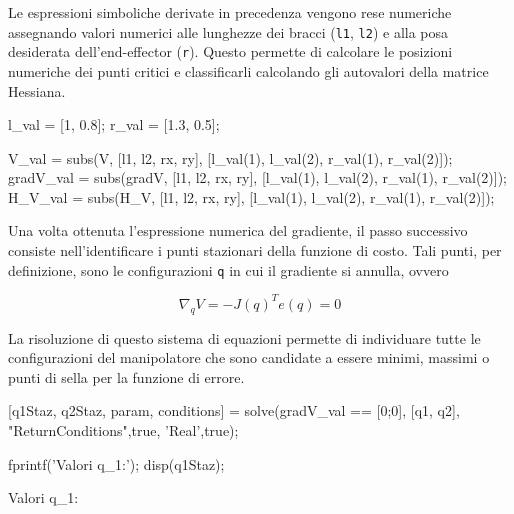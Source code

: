 \documentclass[11pt, a4paper]{article}
\begin{document}
\newpage
{}

\begin{par}
\begin{flushleft}
Le espressioni simboliche derivate in precedenza vengono rese numeriche assegnando valori numerici alle lunghezze dei bracci (\texttt{l1}, \texttt{l2}) e alla posa desiderata dell'end-effector (\texttt{r}). Questo permette di calcolare le posizioni numeriche dei punti critici e classificarli calcolando gli autovalori della matrice Hessiana.
\end{flushleft}
\end{par}

\begin{matlabcode}

l_val = [1, 0.8];
r_val = [1.3, 0.5];

V_val = subs(V, [l1, l2, rx, ry], [l_val(1), l_val(2), r_val(1), r_val(2)]);
gradV_val = subs(gradV, [l1, l2, rx, ry], [l_val(1), l_val(2), r_val(1), r_val(2)]);
H_V_val = subs(H_V, [l1, l2, rx, ry], [l_val(1), l_val(2), r_val(1), r_val(2)]);
\end{matlabcode}

\begin{par}
\begin{flushleft}
Una volta ottenuta l'espressione numerica del gradiente, il passo successivo consiste nell'identificare i punti stazionari della funzione di costo. Tali punti, per definizione, sono le configurazioni \texttt{q} in cui il gradiente si annulla, ovvero
\end{flushleft}
\end{par}

\[
    \nabla_q V = -J(q)^T e(q) = 0
\]

\begin{par}
\begin{flushleft}
La risoluzione di questo sistema di equazioni permette di individuare tutte le configurazioni del manipolatore che sono candidate a essere minimi, massimi o punti di sella per la funzione di errore.
\end{flushleft}
\end{par}

\begin{matlabcode}
[q1Staz, q2Staz, param, conditions] = solve(gradV_val == [0;0], [q1, q2], "ReturnConditions",true, 'Real',true);

fprintf('Valori q_1:');
disp(q1Staz);
\end{matlabcode}
\begin{matlaboutput}
Valori q_1:
\end{matlaboutput}
\end{document}

